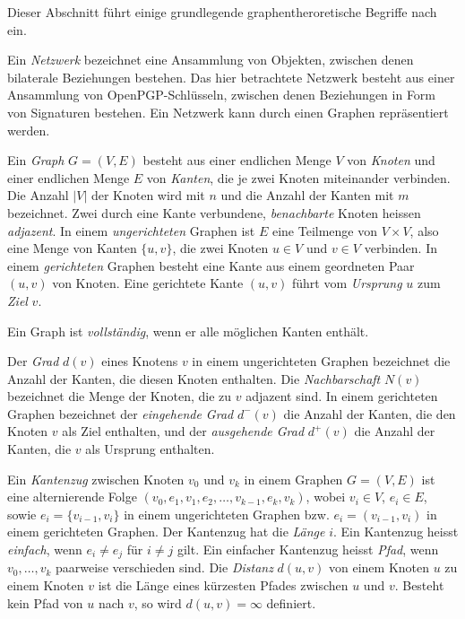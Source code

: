 Dieser Abschnitt f\"uhrt einige grundlegende graphentheroretische
Begriffe nach \cite{Brandes2004} ein.
  
Ein \emph{Netzwerk} bezeichnet eine Ansammlung von Objekten, zwischen
denen bilaterale Beziehungen bestehen. Das hier betrachtete Netzwerk
besteht aus einer Ansammlung von OpenPGP-Schl\"usseln, zwischen denen
Beziehungen in Form von Signaturen bestehen. Ein Netzwerk kann durch einen
Graphen repr\"asentiert werden.

Ein \emph{Graph} $G=(V, E)$ besteht aus einer endlichen Menge $V$ von
\emph{Knoten} und einer endlichen Menge $E$ von \emph{Kanten}, die je
zwei Knoten miteinander verbinden. Die Anzahl $|V|$ der Knoten wird mit
$n$ und die Anzahl der Kanten mit $m$ bezeichnet. Zwei durch eine
Kante verbundene, \emph{benachbarte} Knoten heissen
\emph{adjazent}. In einem \emph{ungerichteten} Graphen ist $E$ eine
Teilmenge von $V\times V$, also eine Menge von Kanten $\{u, v\}$, die
zwei Knoten $u \in V$ und $v\in V$ verbinden. In einem
\emph{gerichteten} Graphen besteht eine Kante aus einem geordneten
Paar $(u, v)$ von Knoten. Eine gerichtete Kante $(u, v)$ f\"uhrt vom
\emph{Ursprung} $u$ zum \emph{Ziel} $v$.

Ein Graph ist \emph{vollst\"andig}, wenn er alle m\"oglichen Kanten
enth\"alt.

Der \emph{Grad} $d(v)$ eines Knotens $v$ in einem ungerichteten
Graphen bezeichnet die Anzahl der Kanten, die diesen Knoten
enthalten. Die \emph{Nachbarschaft} $N(v)$ bezeichnet die Menge der
Knoten, die zu $v$ adjazent sind. In einem gerichteten Graphen
bezeichnet der \emph{eingehende Grad} $d^{-}(v)$ die Anzahl der
Kanten, die den Knoten $v$ als Ziel enthalten, und der
\emph{ausgehende Grad} $d^{+}(v)$ die Anzahl der Kanten, die $v$ als
Ursprung enthalten.

Ein \emph{Kantenzug} zwischen Knoten $v_0$ und $v_k$ in einem Graphen
$G=(V, E)$ ist eine alternierende Folge $(v_0, e_1, v_1, e_2, \dots,
v_{k-1}, e_k, v_k)$, wobei $v_i \in V$, $e_i \in E$, sowie $e_i =
\{v_{i-1}, v_{i}\}$ in einem ungerichteten Graphen bzw. $e_i =
(v_{i-1}, v_{i})$ in einem gerichteten Graphen. Der Kantenzug hat die
\emph{L\"ange} $i$. Ein Kantenzug heisst \emph{einfach}, wenn $e_i \ne
e_j$ f\"ur $i \ne j$ gilt.  Ein einfacher Kantenzug heisst
\emph{Pfad}, wenn $v_0, \dots, v_k$ paarweise verschieden sind. Die
\emph{Distanz} $d(u, v)$ von einem Knoten $u$ zu einem Knoten $v$ ist die
L\"ange eines k\"urzesten Pfades zwischen $u$ und $v$. Besteht kein
Pfad von $u$ nach $v$, so wird $d(u,v) = \infty$ definiert.

